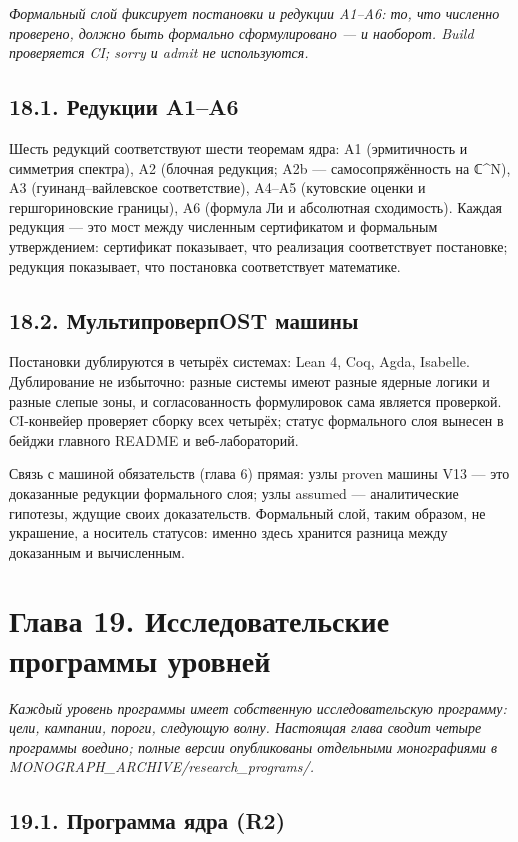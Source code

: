 \documentclass[11pt,a4paper]{article}
\begin{document}
\noindent\textit{\color{copper}Формальный слой фиксирует постановки и редукции A1–A6: то, что численно проверено, должно быть формально сформулировано — и наоборот. Build проверяется CI; sorry и admit не используются.}

\subsection{18.1. Редукции A1–A6}

Шесть редукций соответствуют шести теоремам ядра: A1 (эрмитичность и симметрия спектра), A2 (блочная редукция; A2b — самосопряжённость на ℂ\textasciicircum{}N), A3 (гуинанд–вайлевское соответствие), A4–A5 (кутовские оценки и гершгориновские границы), A6 (формула Ли и абсолютная сходимость). Каждая редукция — это мост между численным сертификатом и формальным утверждением: сертификат показывает, что реализация соответствует постановке; редукция показывает, что постановка соответствует математике.

\subsection{18.2. МультипроверпOST машины}

Постановки дублируются в четырёх системах: Lean 4, Coq, Agda, Isabelle. Дублирование не избыточно: разные системы имеют разные ядерные логики и разные слепые зоны, и согласованность формулировок сама является проверкой. CI-конвейер проверяет сборку всех четырёх; статус формального слоя вынесен в бейджи главного README и веб-лабораторий.

Связь с машиной обязательств (глава 6) прямая: узлы proven машины V13 — это доказанные редукции формального слоя; узлы assumed — аналитические гипотезы, ждущие своих доказательств. Формальный слой, таким образом, не украшение, а носитель статусов: именно здесь хранится разница между доказанным и вычисленным.

\section{Глава 19. Исследовательские программы уровней}

\noindent\textit{\color{copper}Каждый уровень программы имеет собственную исследовательскую программу: цели, кампании, пороги, следующую волну. Настоящая глава сводит четыре программы воедино; полные версии опубликованы отдельными монографиями в MONOGRAPH\_ARCHIVE/research\_programs/.}

\subsection{19.1. Программа ядра (R2)}
\end{document}
